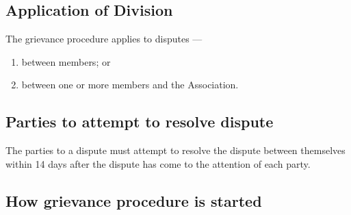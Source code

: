 \documentclass[../constitution.tex]{subfiles}
\begin{document}
\hypertarget{application-of-division}{%
  \subsection{Application of Division}\label{application-of-division}}

The grievance procedure applies to disputes ---

\begin{enumerate}
  \def\labelenumi{\alph{enumi})}
  \setcounter{enumi}{0}
  \item between members; or
  \item between one or more members and the Association.
\end{enumerate}

\hypertarget{parties-to-attempt-to-resolve-dispute}{%
  \subsection{Parties to attempt to resolve dispute}\label{parties-to-attempt-to-resolve-dispute}}

The parties to a dispute must attempt to resolve the dispute between themselves within 14 days after the dispute has come to the attention of each party.

\hypertarget{how-grievance-procedure-is-started}{%
  \subsection{How grievance procedure is started}\label{how-grievance-procedure-is-started}}
\end{document}
